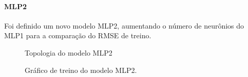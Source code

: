 \documentclass[	12pt, Times, openright, twoside, a4paper, english, brazil]{abntex2}
\begin{document}
    	        \paragraph{MLP2}
    	        Foi definido um novo modelo MLP2, aumentando o número de neurônios do MLP1 para a comparação do RMSE de treino.
    	        \begin{figure}[!ht]
                	\caption{Topologia do modelo MLP2 \label{fig:case1_mlp2} }
                \end{figure}
                \begin{figure}[!ht]
                	\caption{Gráfico de treino do modelo MLP2. \label{fig:case1_mlp2_train} }
                \end{figure}
\end{document}
